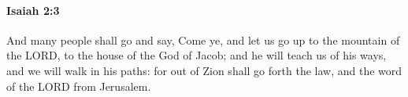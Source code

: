 
		\paragraph{Isaiah 2:3} %
			\label{ISAIAH-2-3}

			And many people shall go and say, Come ye, and let us go up to the mountain of the LORD, to the house of the God of Jacob; and he will teach us of his ways, and we will walk in his paths: for out of Zion shall go forth the law, and the word of the LORD from Jerusalem.



